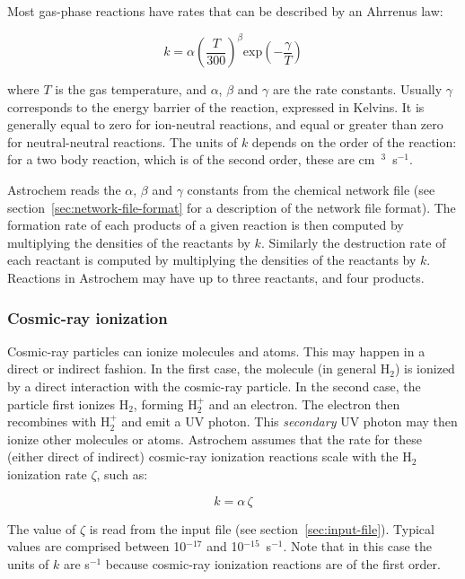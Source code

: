 \documentclass[a4paper,12pt]{article}
\begin{document}
Most gas-phase reactions have rates that can be described by an
Ahrrenus law:

\begin{equation}
  k = \alpha  \left( \frac{T}{300} \right)^\beta  \mathrm{exp} \left(
    -\frac{\gamma}{T} \right)
  \label{eq:arrhenius}
\end{equation}

\noindent
where $T$ is the gas temperature, and $\alpha$, $\beta$ and $\gamma$
are the rate constants. Usually $\gamma$ corresponds to the energy
barrier of the reaction, expressed in Kelvins. It is generally equal
to zero for ion-neutral reactions, and equal or greater than zero for
neutral-neutral reactions. The units of $k$ depends on the order of
the reaction: for a two body reaction, which is of the second order,
these are cm~$^{3}$~s$^{-1}$.

Astrochem reads the $\alpha$, $\beta$ and $\gamma$ constants from the
chemical network file (see section~\ref{sec:network-file-format} for a
description of the network file format). The formation rate of each
products of a given reaction is then computed by multiplying the
densities of the reactants by $k$. Similarly the destruction rate of
each reactant is computed by multiplying the densities of the
reactants by $k$. Reactions in Astrochem may have up to three
reactants, and four products.

\subsubsection{Cosmic-ray ionization}
\label{sec:cosm-ray-ioniz}

Cosmic-ray particles can ionize molecules and atoms. This may happen
in a direct or indirect fashion. In the first case, the molecule (in
general H$_{2}$) is ionized by a direct interaction with the
cosmic-ray particle. In the second case, the particle first ionizes
H$_{2}$, forming H$_{2}^{+}$ and an electron. The electron then
recombines with H$_{2}^{+}$ and emit a UV photon. This
\emph{secondary} UV photon may then ionize other molecules or
atoms. Astrochem assumes that the rate for these (either direct of
indirect) cosmic-ray ionization reactions scale with the H$_{2}$
ionization rate $\zeta$, such as:

\begin{equation}
  k = \alpha  \, \zeta
  \label{eq:cosmic-ray-ionization}
\end{equation}

\noindent
The value of $\zeta$ is read from the input file (see
section~\ref{sec:input-file}). Typical values are comprised between
10$^{-17}$ and 10$^{-15}$~s$^{-1}$. Note that in this case the units
of $k$ are s$^{-1}$ because cosmic-ray ionization reactions are of the
first order.
\end{document}

